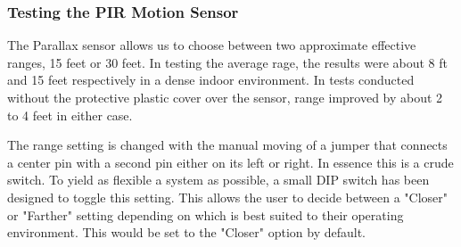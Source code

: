 \subsubsection{Testing the PIR Motion Sensor}
\par The Parallax sensor allows us to choose between two approximate effective ranges, 15 feet or 30 feet. In testing the average rage, the results were about 8 ft and 15 feet respectively in a dense indoor environment. In tests conducted without the protective plastic cover over the sensor, range improved by about 2 to 4 feet in either case. 
\par The range setting is changed with the manual moving of a jumper that connects a center pin with a second pin either on its left or right. In essence this is a crude switch. To yield as flexible a system as possible, a small DIP switch has been designed to toggle this setting. This allows the user to decide between a "Closer" or "Farther" setting depending on which is best suited to their operating environment. This would be set to the "Closer" option by default. 


 


